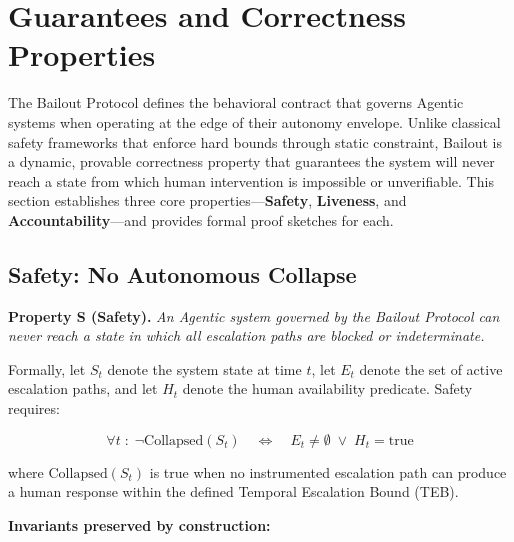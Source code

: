 \section{Guarantees and Correctness Properties}

The Bailout Protocol defines the behavioral contract that governs Agentic systems when operating at the edge of their autonomy envelope. Unlike classical safety frameworks that enforce hard bounds through static constraint, Bailout is a dynamic, provable correctness property that guarantees the system will never reach a state from which human intervention is impossible or unverifiable. This section establishes three core properties—\textbf{Safety}, \textbf{Liveness}, and \textbf{Accountability}—and provides formal proof sketches for each.

\subsection{Safety: No Autonomous Collapse}

\textbf{Property S (Safety).} \emph{An Agentic system governed by the Bailout Protocol can never reach a state in which all escalation paths are blocked or indeterminate.}

Formally, let $S_t$ denote the system state at time $t$, let $E_t$ denote the set of active escalation paths, and let $H_t$ denote the human availability predicate. Safety requires:

\[
\forall t \;:\; \neg \text{Collapsed}(S_t) \quad \iff \quad E_t \neq \emptyset \;\lor\; H_t = \text{true}
\]

where $\text{Collapsed}(S_t)$ is true when no instrumented escalation path can produce a human response within the defined Temporal Escalation Bound (TEB).

\textbf{Invariants preserved by construction:}

